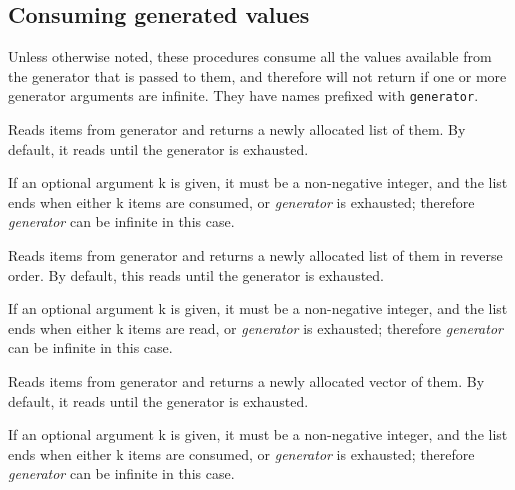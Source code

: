 \subsection{Consuming generated values}\label{consuming-generated-values}

Unless otherwise noted, these procedures consume all the values
available from the generator that is passed to them, and therefore will
not return if one or more generator arguments are infinite. They have
names prefixed with \texttt{generator}.

\begin{entry}{%
  }

Reads items from generator and returns a newly allocated list of them.
By default, it reads until the generator is exhausted.

If an optional argument k is given, it must be a non-negative integer,
and the list ends when either k items are consumed, or \emph{generator}
is exhausted; therefore \emph{generator} can be infinite in this case.
\end{entry}

\begin{entry}{%
  }

Reads items from generator and returns a newly allocated list of them in
reverse order. By default, this reads until the generator is exhausted.

If an optional argument k is given, it must be a non-negative integer,
and the list ends when either k items are read, or \emph{generator} is
exhausted; therefore \emph{generator} can be infinite in this case.
\end{entry}

\begin{entry}{%
  }

Reads items from generator and returns a newly allocated vector of them.
By default, it reads until the generator is exhausted.

If an optional argument k is given, it must be a non-negative integer,
and the list ends when either k items are consumed, or \emph{generator}
is exhausted; therefore \emph{generator} can be infinite in this case.
\end{entry}

